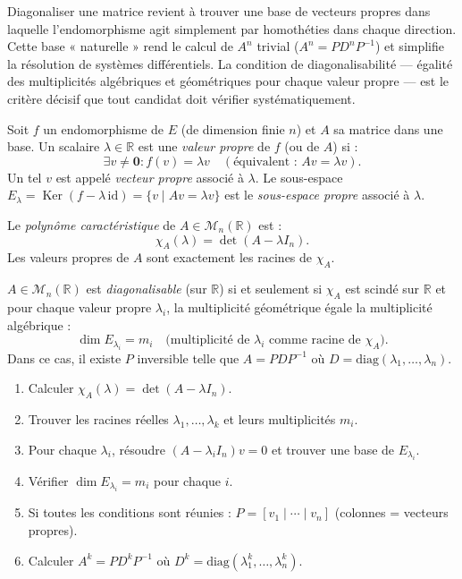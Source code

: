 \documentclass[11pt,a4paper,twoside]{book}
\newcommand{\R}{\mathbb{R}}
\DeclareMathOperator{\Ker}{Ker}
\begin{document}
Diagonaliser une matrice revient à trouver une base de vecteurs propres dans laquelle l'endomorphisme agit simplement par homothéties dans chaque direction. Cette base « naturelle » rend le calcul de $A^n$ trivial ($A^n = PD^nP^{-1}$) et simplifie la résolution de systèmes différentiels. La condition de diagonalisabilité — égalité des multiplicités algébriques et géométriques pour chaque valeur propre — est le critère décisif que tout candidat doit vérifier systématiquement.

\begin{definitionbox}
Soit $f$ un endomorphisme de $E$ (de dimension finie $n$) et $A$ sa matrice dans une base.
Un scalaire $\lambda \in \R$ est une \emph{valeur propre} de $f$ (ou de $A$) si :
\[
  \exists v \neq \mathbf{0} : f(v) = \lambda v \quad (\text{équivalent : } Av = \lambda v).
\]
Un tel $v$ est appelé \emph{vecteur propre} associé à $\lambda$.
Le sous-espace $E_\lambda = \Ker(f - \lambda \,\mathrm{id}) = \{v \mid Av = \lambda v\}$
est le \emph{sous-espace propre} associé à $\lambda$.
\end{definitionbox}

\begin{definitionbox}
Le \emph{polynôme caractéristique} de $A \in \mathcal{M}_n(\R)$ est :
\[
  \chi_A(\lambda) = \det(A - \lambda I_n).
\]
Les valeurs propres de $A$ sont exactement les racines de $\chi_A$.
\end{definitionbox}

\begin{theoremebox}[Diagonalisation]
$A \in \mathcal{M}_n(\R)$ est \emph{diagonalisable} (sur $\R$) si et seulement si
$\chi_A$ est scindé sur $\R$ et pour chaque valeur propre $\lambda_i$, la multiplicité
géométrique égale la multiplicité algébrique :
\[
  \dim E_{\lambda_i} = m_i \quad \text{(multiplicité de $\lambda_i$ comme racine de $\chi_A$)}.
\]
Dans ce cas, il existe $P$ inversible telle que $A = P D P^{-1}$
où $D = \mathrm{diag}(\lambda_1,\ldots,\lambda_n)$.
\end{theoremebox}

\begin{methodebox}
\begin{enumerate}
  \item Calculer $\chi_A(\lambda) = \det(A - \lambda I_n)$.
  \item Trouver les racines réelles $\lambda_1, \ldots, \lambda_k$ et leurs multiplicités $m_i$.
  \item Pour chaque $\lambda_i$, résoudre $(A - \lambda_i I_n)v = 0$ et trouver une base de $E_{\lambda_i}$.
  \item Vérifier $\dim E_{\lambda_i} = m_i$ pour chaque $i$.
  \item Si toutes les conditions sont réunies : $P = [v_1 \mid \cdots \mid v_n]$ (colonnes = vecteurs propres).
  \item Calculer $A^k = P D^k P^{-1}$ où $D^k = \mathrm{diag}(\lambda_1^k,\ldots,\lambda_n^k)$.
\end{enumerate}
\end{methodebox}
\end{document}
